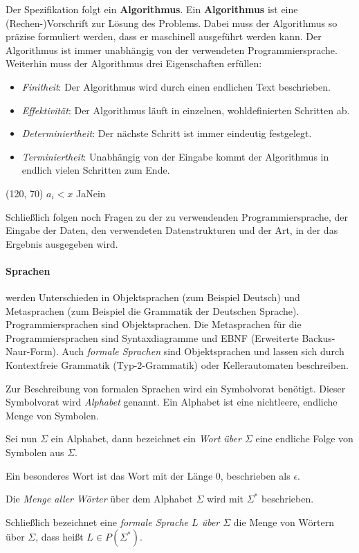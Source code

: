 \documentclass{scrreprt}
\begin{document}
Der Spezifikation folgt ein \textbf{Algorithmus}.
Ein \textbf{Algorithmus} ist eine (Rechen-)Vorschrift zur Lösung des Problems.
Dabei muss der Algorithmus so präzise formuliert werden, dass er maschinell
ausgeführt werden kann.
Der Algorithmus ist immer unabhängig von der verwendeten Programmiersprache.
Weiterhin muss der Algorithmus drei Eigenschaften erfüllen:
\begin{itemize}
\item \emph{Finitheit}: Der Algorithmus wird durch einen endlichen Text
  beschrieben.
\item \emph{Effektivität}: Der Algorithmus läuft in einzelnen, wohldefinierten
  Schritten ab.
\item \emph{Determiniertheit}: Der nächste Schritt ist immer eindeutig
  festgelegt.
\item \emph{Terminiertheit}: Unabhängig von der Eingabe kommt der Algorithmus
  in endlich vielen Schritten zum Ende.
\end{itemize}

\begin{struktogramm}(120, 70)
     {$a_i < x$} {Ja}{Nein}
      \change
    \ifend
  \whileend
\end{struktogramm}

Schließlich folgen noch Fragen zu der zu verwendenden Programmiersprache,
der Eingabe der Daten, den verwendeten Datenstrukturen und der Art, in der das
Ergebnis ausgegeben wird.

\paragraph{Sprachen} werden Unterschieden in Objektsprachen (zum Beispiel
Deutsch) und Metasprachen (zum Beispiel die Grammatik der Deutschen Sprache).
Programmiersprachen sind Objektsprachen.
Die Metasprachen für die Programmiersprachen sind Syntaxdiagramme
und EBNF (Erweiterte Backus-Naur-Form).
Auch \emph{formale Sprachen} sind Objektsprachen und lassen sich durch
Kontextfreie Grammatik (Typ-2-Grammatik) oder Kellerautomaten beschreiben.

Zur Beschreibung von formalen Sprachen wird ein Symbolvorat benötigt.
Dieser Symbolvorat wird \emph{Alphabet} genannt.
Ein Alphabet ist eine nichtleere, endliche Menge von Symbolen.

Sei nun $\Sigma$ ein Alphabet, dann bezeichnet ein
\emph{Wort über $\Sigma$} eine endliche Folge von Symbolen aus $\Sigma$.

Ein besonderes Wort ist das Wort mit der Länge $0$, beschrieben als
$\epsilon$.

Die \emph{Menge aller Wörter} über dem Alphabet $\Sigma$ wird mit $\Sigma^*$
beschrieben.

Schließlich bezeichnet eine \emph{formale Sprache $L$ über $\Sigma$} die Menge
von Wörtern über $\Sigma$, dass heißt $L \in P(\Sigma^*)$.
\end{document}

